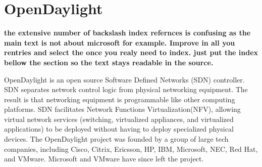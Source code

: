 \section{OpenDaylight}

{\bf the extensive number of backslash index refernces is confusing as the main
  text is not about microsoft for example. Improve in all you rentries
and select the once you realy need to index. just put the index bellow
the section so the text stays readable in the source.}

OpenDaylight is an open source Software Defined Networks (SDN)
controller\cite{hid-sp18-419-www-opendaylight}. SDN separates network
control logic from physical networking equipment. The result is that
networking equipment is programmable like other computing
platforms. SDN facilitates Network Functions Virtualization(NFV),
allowing virtual network services (switching, virtualized
appliances, and virtualized applications) to be deployed without
having to deploy specialized physical
devices\cite{hid-sp18-419-www-cio-sdn-nfv}. The OpenDaylight project
was founded by a group of large tech companies, including Cisco,
Citrix, Ericsson, HP, IBM, Microsoft, NEC, Red Hat, and
VMware. Microsoft and VMware have since left the
project\cite{hid-sp18-419-www-sdx-odl}.

